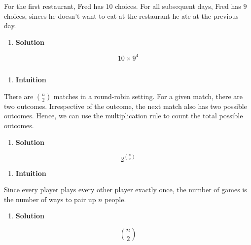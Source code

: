 \documentclass[]{book}
\providecommand{\tightlist}{%
  \setlength{\itemsep}{0pt}\setlength{\parskip}{0pt}}
\begin{document}
For the first restaurant, Fred has \(10\) choices. For all subsequent
days, Fred has \(9\) choices, sinces he doesn't want to eat at the
restaurant he ate at the previous day.

\begin{enumerate}
\def\labelenumi{(\alph{enumi})}
\setcounter{enumi}{1}
\tightlist
\item
  \textbf{Solution}
\end{enumerate}

\[ 10 \times 9^{4} \]

\subsection{}\label{section-3}

\begin{enumerate}
\def\labelenumi{(\alph{enumi})}
\tightlist
\item
  \textbf{Intuition}
\end{enumerate}

There are \({n \choose 2}\) matches in a round-robin setting. For a
given match, there are two outcomes. Irrespective of the outcome, the
next match also has two possible outcomes. Hence, we can use the
multiplication rule to count the total possible outcomes.

\begin{enumerate}
\def\labelenumi{(\alph{enumi})}
\tightlist
\item
  \textbf{Solution}
\end{enumerate}

\[ 2^{{n \choose 2}} \]

\begin{enumerate}
\def\labelenumi{(\alph{enumi})}
\setcounter{enumi}{1}
\tightlist
\item
  \textbf{Intuition}
\end{enumerate}

Since every player plays every other player exactly once, the number of
games is the number of ways to pair up \(n\) people.

\begin{enumerate}
\def\labelenumi{(\alph{enumi})}
\setcounter{enumi}{1}
\tightlist
\item
  \textbf{Solution}
\end{enumerate}

\[ {n \choose 2} \]


\end{document}
